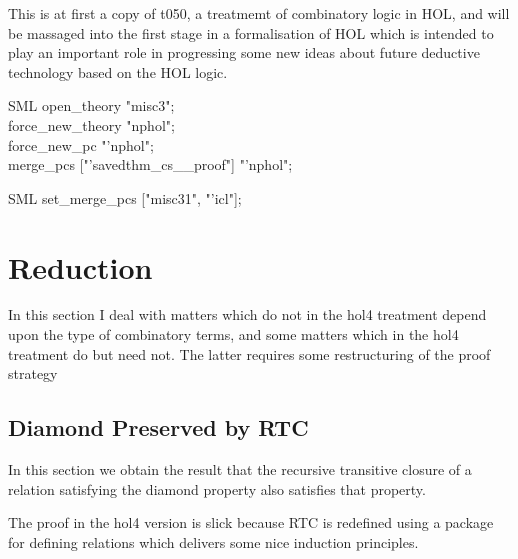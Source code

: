 \def\VCDate{2025/06/04}\def\VCVersion{2e6554f}

This is at first a copy of t050, a treatmemt of combinatory logic in HOL, and will be massaged into the first stage in a formalisation of HOL which is intended to play an important role in progressing some new ideas about future deductive technology based on the HOL logic.

\begin{GFT}{SML}
\+open\_theory "misc3";\\
\+force\_new\_theory "\PrNL{}nphol\PrNN{}";\\
\+force\_new\_pc \PrNL{}"'nphol"\PrNN{};\\
\+merge\_pcs ["'savedthm\_cs\_\MMM{\exists}\_proof"] "'nphol";\\
\end{GFT}
\begin{GFT}{SML}
\+set\_merge\_pcs ["misc31", "'icl"];\\
\end{GFT}

\section{Reduction}

In this section I deal with matters which do not in the hol4 treatment depend upon the type of combinatory terms, and some matters which in the hol4 treatment do but need not.
The latter requires some restructuring of the proof strategy

\subsection{Diamond Preserved by RTC}

In this section we obtain the result that the recursive transitive closure of a relation satisfying the diamond property also satisfies that property.

The proof in the hol4 version is slick because RTC is redefined using a package for defining relations which delivers some nice induction principles.

